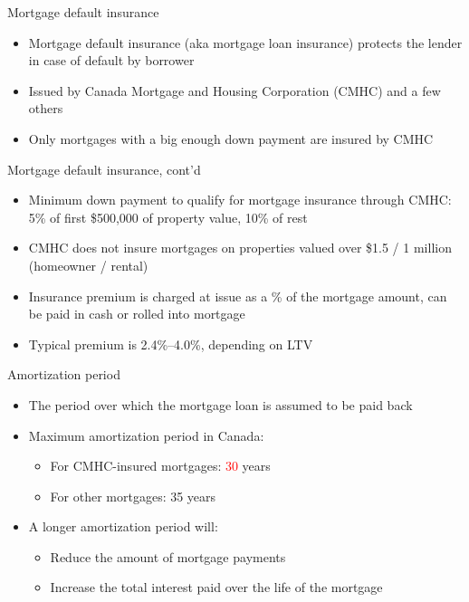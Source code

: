 \documentclass{beamer}
\begin{document}
\begin{frame}{Mortgage default insurance}

\begin{itemize}
\item Mortgage default insurance (aka mortgage loan insurance) protects the lender in case of default by borrower
\medskip
\item Issued by Canada Mortgage and Housing Corporation (CMHC) and a few others
\medskip
\item Only mortgages with a big enough down payment are insured by CMHC
\end{itemize}

\end{frame}

\begin{frame}{Mortgage default insurance, cont'd}

\begin{itemize}
\item Minimum down payment to qualify for mortgage insurance through CMHC: 5\% of first \$500,000 of property value, 10\% of rest
\medskip
\item CMHC does not insure mortgages on properties valued over \$1.5 / 1 million (homeowner / rental)
\medskip
\item Insurance premium is charged at issue as a \% of the mortgage amount, can be paid in cash or rolled into mortgage
\medskip
\item Typical premium is 2.4\%--4.0\%, depending on LTV
\end{itemize}

\end{frame}

\begin{frame}{Amortization period}

\begin{itemize}
\item The period over which the mortgage loan is assumed to be paid back
\item Maximum amortization period in Canada:
  \begin{itemize}
  \item For CMHC-insured mortgages: \textcolor{red}{30} years
  \item For other mortgages: 35 years
  \end{itemize}
\item A longer amortization period will:
  \begin{itemize}
  \item Reduce the amount of mortgage payments
  \item Increase the total interest paid over the life of the mortgage
  \end{itemize}
\end{itemize}

\end{frame}
\end{document}
